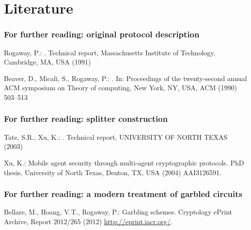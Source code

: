 \documentclass{beamer}
\begin{document}
\section{Literature}
\label{sec:literature}

\begin{frame}
  \frametitle{For further reading: original protocol description}
  \begin{thebibliography}{10}

    Rogaway, P.:
    .
    \newblock Technical report, Massachusetts Institute of Technology, Cambridge,
    MA, USA (1991)

    Beaver, D., Micali, S., Rogaway, P.:
    .
    \newblock In: Proceedings of the twenty-second annual ACM symposium on Theory
    of computing, New York, NY, USA, ACM (1990)  503--513

  \end{thebibliography}

\end{frame}

\begin{frame}
  \frametitle{For further reading: splitter construction}
  \begin{thebibliography}{10}
    Tate, S.R., Xu, K.:
    .
    \newblock Technical report, UNIVERSITY OF NORTH TEXAS (2003)

    Xu, K.:
    \newblock Mobile agent security through multi-agent cryptographic protocols.
    \newblock PhD thesis, University of North Texas, Denton, TX, USA (2004)
    AAI3126591.    
  \end{thebibliography}
\end{frame}

\begin{frame}
  \frametitle{For further reading: a modern treatment of garbled circuits}
  \begin{thebibliography}{10}
    Bellare, M., Hoang, V.T., Rogaway, P.:
    \newblock Garbling schemes.
    \newblock Cryptology ePrint Archive, Report 2012/265 (2012)
    \url{http://eprint.iacr.org/}.
  \end{thebibliography}
\end{frame}
\end{document}
